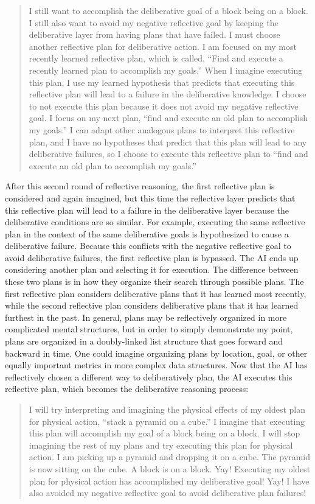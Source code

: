 \begin{quote}
  I still want to accomplish the deliberative goal of a block being on
  a block.  I still also want to avoid my negative reflective goal by
  keeping the deliberative layer from having plans that have failed.
  I must choose another reflective plan for deliberative action.  I am
  focused on my most recently learned reflective plan, which is
  called, ``Find and execute a recently learned plan to accomplish my
  goals.''  When I imagine executing this plan, I use my learned
  hypothesis that predicts that executing this reflective plan will
  lead to a failure in the deliberative knowledge.  I choose to not
  execute this plan because it does not avoid my negative reflective
  goal.  I focus on my next plan, ``find and execute an old plan to
  accomplish my goals.''  I can adapt other analogous plans to
  interpret this reflective plan, and I have no hypotheses that
  predict that this plan will lead to any deliberative failures, so I
  choose to execute this reflective plan to ``find and execute an old
  plan to accomplish my goals.''
\end{quote}
After this second round of reflective reasoning, the first reflective
plan is considered and again imagined, but this time the reflective
layer predicts that this reflective plan will lead to a failure in the
deliberative layer because the deliberative conditions are so similar.
For example, executing the same reflective plan in the context of the
same deliberative goals is hypothesized to cause a deliberative
failure.  Because this conflicts with the negative reflective goal to
avoid deliberative failures, the first reflective plan is bypassed.
The AI ends up considering another plan and selecting it for
execution.  The difference between these two plans is in how they
organize their search through possible plans.  The first reflective
plan considers deliberative plans that it has learned most recently,
while the second reflective plan considers deliberative plans that it
has learned furthest in the past.  In general, plans may be
reflectively organized in more complicated mental structures, but in
order to simply demonstrate my point, plans are organized in a
doubly-linked list structure that goes forward and backward in time.
One could imagine organizing plans by location, goal, or other equally
important metrics in more complex data structures.  Now that the AI
has reflectively chosen a different way to deliberatively plan, the AI
executes this reflective plan, which becomes the deliberative
reasoning process:
\begin{quote}
  I will try interpreting and imagining the physical effects of my
  oldest plan for physical action, ``stack a pyramid on a cube.''  I
  imagine that executing this plan will accomplish my goal of a block
  being on a block.  I will stop imagining the rest of my plans and
  try executing this plan for physical action.  I am picking up a
  pyramid and dropping it on a cube.  The pyramid is now sitting on
  the cube.  A block is on a block.  Yay!  Executing my oldest plan
  for physical action has accomplished my deliberative goal!  Yay!  I
  have also avoided my negative reflective goal to avoid deliberative
  plan failures!
\end{quote}
